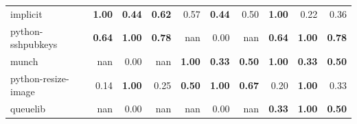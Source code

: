 \documentclass[11pt,dvipdfmx]{jreport}
\begin{document}
\begin{table}{}
{\begin{tabular}{l||p{4em}|p{4em}|p{4em}||p{4em}|p{4em}|p{4em}||p{4em}|p{4em}|p{4em}}
            \hline \hline
            implicit & \multicolumn{1}{r|}{\textbf{1.00}} & \multicolumn{1}{r|}{\textbf{0.44}} & \multicolumn{1}{r||}{\textbf{0.62}} & \multicolumn{1}{r|}{0.57} & \multicolumn{1}{r|}{\textbf{0.44}} & \multicolumn{1}{r||}{0.50} & \multicolumn{1}{r|}{\textbf{1.00}} & \multicolumn{1}{r|}{0.22} & \multicolumn{1}{r}{0.36} \\
            python-sshpubkeys & \multicolumn{1}{r|}{\textbf{0.64}} & \multicolumn{1}{r|}{\textbf{1.00}} & \multicolumn{1}{r||}{\textbf{0.78}} & \multicolumn{1}{r|}{nan} & \multicolumn{1}{r|}{0.00} & \multicolumn{1}{r||}{nan} & \multicolumn{1}{r|}{\textbf{0.64}} & \multicolumn{1}{r|}{\textbf{1.00}} & \multicolumn{1}{r}{\textbf{0.78}} \\
            munch & \multicolumn{1}{r|}{nan} & \multicolumn{1}{r|}{0.00} & \multicolumn{1}{r||}{nan} & \multicolumn{1}{r|}{\textbf{1.00}} & \multicolumn{1}{r|}{\textbf{0.33}} & \multicolumn{1}{r||}{\textbf{0.50}} & \multicolumn{1}{r|}{\textbf{1.00}} & \multicolumn{1}{r|}{\textbf{0.33}} & \multicolumn{1}{r}{\textbf{0.50}} \\
            python-resize-image & \multicolumn{1}{r|}{0.14} & \multicolumn{1}{r|}{\textbf{1.00}} & \multicolumn{1}{r||}{0.25} & \multicolumn{1}{r|}{\textbf{0.50}} & \multicolumn{1}{r|}{\textbf{1.00}} & \multicolumn{1}{r||}{\textbf{0.67}} & \multicolumn{1}{r|}{0.20} & \multicolumn{1}{r|}{\textbf{1.00}} &\multicolumn{1}{r}{0.33} \\
            queuelib & \multicolumn{1}{r|}{nan} & \multicolumn{1}{r|}{0.00} & \multicolumn{1}{r||}{nan} & \multicolumn{1}{r|}{nan} & \multicolumn{1}{r|}{0.00} & \multicolumn{1}{r||}{nan} & \multicolumn{1}{r|}{\textbf{0.33}} & \multicolumn{1}{r|}{\textbf{1.00}} & \multicolumn{1}{r}{\textbf{0.50}} \\ \hline
        \end{tabular}
    }
\end{table}
\end{document}
